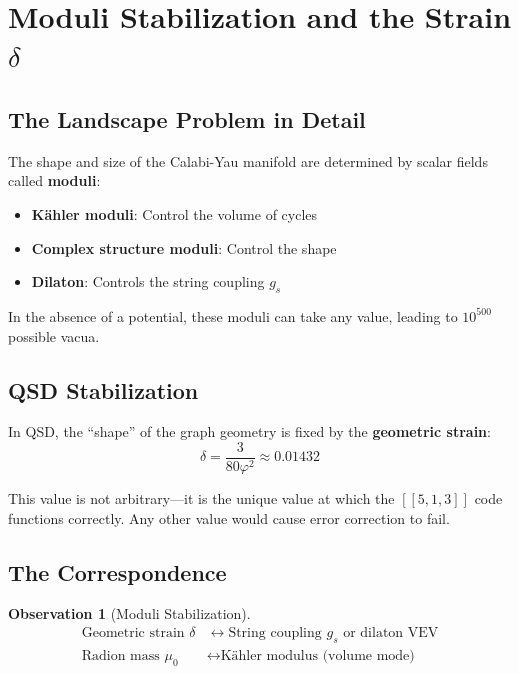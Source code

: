 \documentclass[11pt,a4paper]{article}
\theoremstyle{definition}
\newtheorem{observation}[theorem]{Observation}
\newcommand{\dgeo}{\delta}
\newcommand{\murad}{\mu_0}
\newcommand{\gs}{g_s}
\begin{document}
\section{Moduli Stabilization and the Strain $\dgeo$}
\label{sec:moduli}

\subsection{The Landscape Problem in Detail}

The shape and size of the Calabi-Yau manifold are determined by scalar fields called \textbf{moduli}:
\begin{itemize}[nosep]
    \item \textbf{K\"ahler moduli}: Control the volume of cycles
    \item \textbf{Complex structure moduli}: Control the shape
    \item \textbf{Dilaton}: Controls the string coupling $\gs$
\end{itemize}

In the absence of a potential, these moduli can take any value, leading to $10^{500}$ possible vacua.

\subsection{QSD Stabilization}

In QSD, the ``shape'' of the graph geometry is fixed by the \textbf{geometric strain}:
\begin{equation}
\dgeo = \frac{3}{80\varphi^2} \approx 0.01432
\end{equation}

This value is not arbitrary---it is the unique value at which the $[[5,1,3]]$ code functions correctly. Any other value would cause error correction to fail.

\subsection{The Correspondence}

\begin{observation}[Moduli Stabilization]
\begin{align}
\text{Geometric strain } \dgeo &\longleftrightarrow \text{String coupling } \gs \text{ or dilaton VEV} \\
\text{Radion mass } \murad &\longleftrightarrow \text{K\"ahler modulus (volume mode)}
\end{align}
\end{observation}
\end{document}
